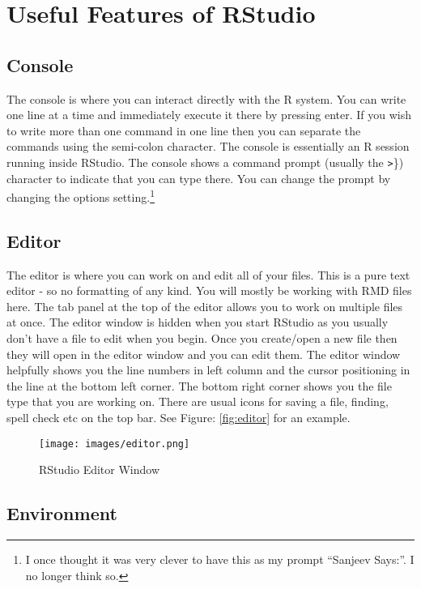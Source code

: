 \documentclass[
]{krantz}
\begin{document}
\hypertarget{useful-features-of-rstudio}{%
\section{Useful Features of RStudio}\label{useful-features-of-rstudio}}

\hypertarget{console}{%
\subsection{Console}\label{console}}

The console is where you can interact directly with the R system. You can write one line at a time and immediately execute it there by pressing enter. If you wish to write more than one command in one line then you can separate the commands using the semi-colon character. The console is essentially an R session running inside RStudio. The console shows a command prompt (usually the \texttt{\textgreater{}}\}) character to indicate that you can type there. You can change the prompt by changing the options setting.\footnote{I once thought it was very clever to have this as my prompt ``Sanjeev Says:''. I no longer think so.}

\hypertarget{editor}{%
\subsection{Editor}\label{editor}}

The editor is where you can work on and edit all of your files. This is a pure text editor - so no formatting of any kind. You will mostly be working with RMD files here. The tab panel at the top of the editor allows you to work on multiple files at once. The editor window is hidden when you start RStudio as you usually don't have a file to edit when you begin. Once you create/open a new file then they will open in the editor window and you can edit them. The editor window helpfully shows you the line numbers in left column and the cursor positioning in the line at the bottom left corner. The bottom right corner shows you the file type that you are working on. There are usual icons for saving a file, finding, spell check etc on the top bar. See Figure: \ref{fig:editor} for an example.

\begin{figure}
\centering
\texttt{[image: images/editor.png]}
\caption{RStudio Editor Window}
\end{figure}

\hypertarget{environment}{%
\subsection{Environment}\label{environment}}
\end{document}
